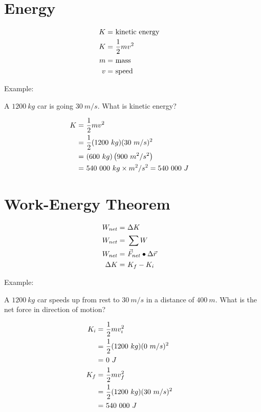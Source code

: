 \section{Energy}

	\begin{align}
		K = \ &\text{kinetic energy}& \notag \\
		K = \ &\frac{1}{2} mv^{2}& \notag \\
		m = \ &\text{mass}& \notag \\
		v = \ &\text{speed}& \notag
	\end{align}

	Example:

	A $1200 \ kg$ car is going $30 \ m/s$. What is kinetic energy?

	\begin{align}
		K = \ &\frac{1}{2} mv^{2}& \notag \\
		= \ &\frac{1}{2} (1200 \ kg)(30 \ m/s)^{2}& \notag \\
		= \ &(600 \ kg)\left(900 \ m^{2}/s^{2}\right)& \notag \\
		= \ &540 \ 000 \ kg \times m^{2}/s^{2} = 540 \ 000 \ J& \notag
	\end{align}

\section{Work-Energy Theorem}

	\begin{align}
		W_{net} = \ &\Delta K& \notag \\
		W_{net} = \ &\sum W& \notag \\
		W_{net} = \ &\vec{F}_{net} \bullet \Delta \vec{r}& \notag \\
		\Delta K = \ &K_{f} - K_{i}& \notag
	\end{align}

	Example:

	A $1200 \ kg$ car speeds up from rest to $30 \ m/s$ in a distance of $400 \ m$. What is the net force in direction of motion?

	\begin{align}
		K_{i} = \ &\frac{1}{2} mv_{i}^{2}& \notag \\
		= \ &\frac{1}{2} (1200 \ kg)(0 \ m/s)^{2}& \notag \\
		= \ &0 \ J& \notag \\
		K_{f} = \ &\frac{1}{2} mv_{f}^{2}& \notag \\
		= \ &\frac{1}{2} (1200 \ kg)(30 \ m/s)^{2}& \notag \\
		= \ &540 \ 000 \ J& \notag
	\end{align}

